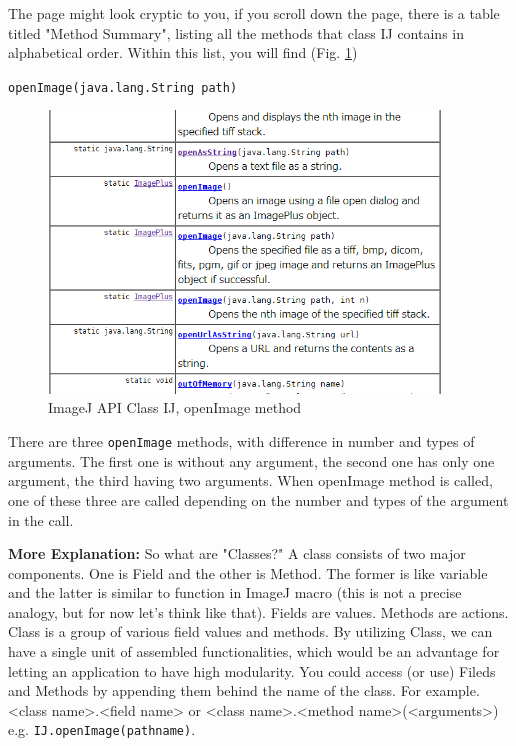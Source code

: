 \documentclass[11pt,a4paper,oneside]{report}
\newcommand{\ilcom}[1]{\texttt{\small#1}}
\begin{document}
The page might look cryptic to you, if you scroll down the page, there is a table titled "Method Summary", listing all the methods that class IJ contains in alphabetical order. Within this list, you will find (Fig. \ref{fig:IJAPIIJopenImage})

\ilcom{openImage(java.lang.String path)} 


\begin{figure}[htbp]
\begin{center}
\includegraphics[height=75mm]{fig2/IJAPI_IJopenImage.png}
\caption{ImageJ API Class IJ, openImage method}
\label{fig:IJAPIIJopenImage}
\end{center}
\end{figure}

There are three \ilcom{openImage} methods, with difference in number and types of arguments. The first one is without any argument, the second one has only one argument, the third having two arguments. When openImage method is called, one of these three are called depending on the number and types of the argument in the call. 

\textbf{More Explanation:} So what are "Classes?" A class consists of two major components. One is Field and the other is Method. The former is like variable and the latter is similar to function in ImageJ macro (this is not a precise analogy, but for now let's think like that). Fields are values. Methods are actions. Class is a group of various field values and methods. By utilizing Class, we can have a single unit of assembled functionalities, which would be an advantage for letting an application to have high modularity. You could access (or use) Fileds and Methods by appending them behind the name of the class. For example. <class name>.<field name> or <class name>.<method name>(<arguments>) e.g. \ilcom{IJ.openImage(pathname)}.
\end{document}
